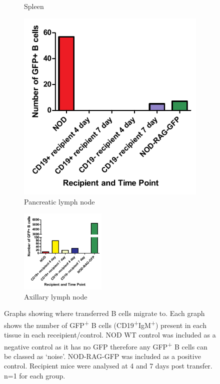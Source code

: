 \begin{figure}
\begin{subfigure}{0.45\textwidth}
	\caption{Spleen}
	\label{subfig:SpleenGFPBcells}
	\end{subfigure}
	\begin{subfigure}{0.45\textwidth}
	\includegraphics[width=\textwidth]{Figures/PLNGFPBcells.pdf}
	\caption{Pancreatic lymph node}
	\label{subfig:PLNGFPBcells}
	\end{subfigure}
	\begin{subfigure}{\textwidth}
	\centering
	\includegraphics[width=0.45\textwidth]{Figures/axLNGFPBcells.pdf}
	\caption{Axillary lymph node}
	\label{subfig:axLNGFPBcells}
	\end{subfigure}
\caption{Graphs showing where transferred B cells migrate to.
Each graph shows the number of GFP\textsuperscript{+} B cells (CD19\textsuperscript{+}IgM\textsuperscript{+}) present in each tissue in each receipient/control. NOD WT control was included as a negative control as it has no GFP therefore any GFP\textsuperscript{+} B cells can be classed as `noise'. 
NOD-RAG-GFP was included as a positive control. 
Recipient mice were analysed at 4 and 7 days post transfer. n=1 for each group.}
\label{fig:GFPBcellgraphs}
\end{figure}

